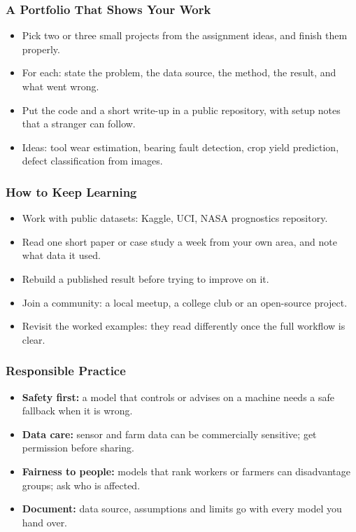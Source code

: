 \begin{frame}[fragile]\frametitle{A Portfolio That Shows Your Work}
\begin{itemize}
\item Pick two or three small projects from the assignment ideas, and finish them properly.
\item For each: state the problem, the data source, the method, the result, and what went wrong.
\item Put the code and a short write-up in a public repository, with setup notes that a stranger can follow.
\item Ideas: tool wear estimation, bearing fault detection, crop yield prediction, defect classification from images.
\end{itemize}
\end{frame}

\begin{frame}[fragile]\frametitle{How to Keep Learning}
\begin{itemize}
\item Work with public datasets: Kaggle, UCI, NASA prognostics repository.
\item Read one short paper or case study a week from your own area, and note what data it used.
\item Rebuild a published result before trying to improve on it.
\item Join a community: a local meetup, a college club or an open-source project.
\item Revisit the worked examples: they read differently once the full workflow is clear.
\end{itemize}
\end{frame}

\begin{frame}[fragile]\frametitle{Responsible Practice}
\begin{itemize}
\item \textbf{Safety first:} a model that controls or advises on a machine needs a safe fallback when it is wrong.
\item \textbf{Data care:} sensor and farm data can be commercially sensitive; get permission before sharing.
\item \textbf{Fairness to people:} models that rank workers or farmers can disadvantage groups; ask who is affected.
\item \textbf{Document:} data source, assumptions and limits go with every model you hand over.
\end{itemize}
\end{frame}

